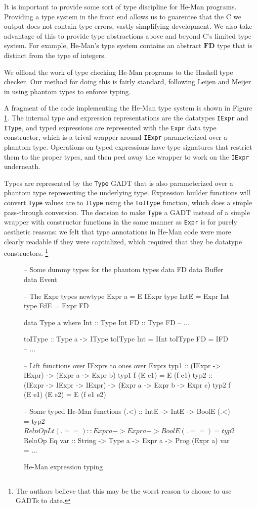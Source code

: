 \documentclass[preprint]{sigplanconf}
\renewcommand{\t}{\texttt}
\renewcommand{\b}{\textbf}
\begin{document}
It is important to provide some sort of type discipline for He-Man
programs. Providing a type system in the front end allows us to
guarentee that the C we output does not contain type errors, vastly
simplifying development. We also take advantage of this to provide
type abstractions above and beyond C's limited type system. %
For example, He-Man's type system contains an abstract
$\b{FD}$ type that is distinct from the type of integers.

We offload the work of type checking He-Man programs to the Haskell type
checker. Our method for doing this is fairly standard, following Leijen and
Meijer \cite{LeijenMeijer} in using phantom types to enforce typing.

A fragment of the code implementing the He-Man type system is shown in
Figure \ref{fig:types}. The internal type and expression
representations are the datatypes \t{IExpr} and \t{IType}, and
typed expressions are represented with the \t{Expr} data type
constructor, which is a trival wrapper around \t{IExpr} parameterized
over a phantom type. Operations on typed expressions have type
signatures that restrict them to the proper types, and then peel away
the wrapper to work on the \t{IExpr} underneath.

Types are represented by the \t{Type} GADT that is also parameterized
over a phantom type representing the underlying type. Expression
builder functions will convert \t{Type} values are to \t{Itype} using
the \t{toItype} function, which does a simple pass-through conversion.
The decision to make \t{Type} a GADT instead of a simple wrapper with
constructor functions in the same manner as \t{Expr} is for purely
aesthetic reasons: we felt that type annotations in He-Man code were
more clearly readable if they were captialized, which required that
they be datatype constructors.
\footnote{The authors believe that this may be the worst reason to
  choose to use GADTs to date.}

\begin{figure}[ht]
\centering
\begin{code}
-- Some dummy types for the phantom types
data FD
data Buffer
data Event

-- The Expr types
newtype Expr a = E IExpr
type IntE = Expr Int
type FdE = Expr FD

data Type a where
  Int :: Type Int
  FD :: Type FD
  -- ...

toIType :: Type a -> IType
toIType Int = IInt
toIType FD = IFD
-- ...

-- Lift functions over IExprs to ones over Exprs
typ1 :: (IExpr -> IExpr) -> (Expr a -> Expr b)
typ1 f (E e1) = E (f e1)
typ2 :: (IExpr -> IExpr -> IExpr) ->
        (Expr a -> Expr b -> Expr c)
typ2 f (E e1) (E e2) = E (f e1 e2)

-- Some typed He-Man functions
(.<) :: IntE -> IntE -> BoolE
(.<) = typ2 $ RelnOp Lt
(.==) :: Expr a -> Expr a -> BoolE
(.==) = typ2 $ RelnOp Eq
var :: String -> Type a -> Expr a -> Prog (Expr a)
var = ...
\end{code}
\caption{He-Man expression typing} %
\label{fig:types}
\end{figure}
\end{document}
